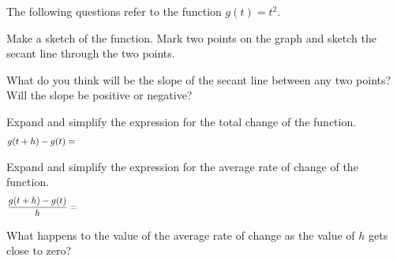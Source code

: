 \begin{problem}
  \item The following questions refer to the function $g(t)=t^2$.
    \begin{subproblem}
      \item  Make a sketch of the function. Mark two points on the
        graph and sketch the secant line through the two points.
        \vfill
      \item What do you think will be the slope of the secant line
        between any two points? Will the slope be positive or negative?
        \vspace{1em}
      \item Expand and simplify the expression for the total change
        of the function.
        \begin{eqnarray*}
          g(t+h)-g(t) & = & \hskip \textwidth
        \end{eqnarray*}
        \vfill
      \item Expand and simplify the expression for the average rate
        of change of the function.
      \begin{eqnarray*}
        \frac{g(t+h)-g(t)}{h} & = & \hskip \textwidth
      \end{eqnarray*}
      \vfill
    \item What happens to the value of the average rate of change as
      the value of $h$ gets close to zero?
      \vspace{3em}
    \end{subproblem}

    \clearpage


\end{problem}
